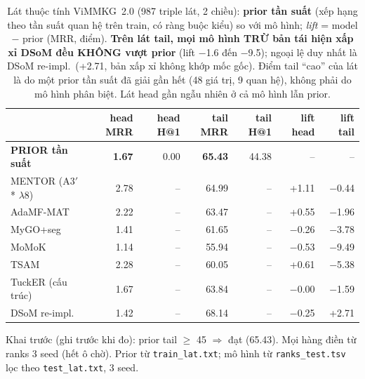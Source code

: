 \begin{table}[t]
\centering
\footnotesize
\setlength{\tabcolsep}{5pt}
\caption{Lát thuộc tính ViMMKG~2.0 (987 triple lát, 2 chiều): \textbf{prior tần suất} (xếp hạng
theo tần suất quan hệ trên train, có ràng buộc kiểu) so với mô hình; \emph{lift} = model $-$ prior
(MRR, điểm). \textbf{Trên lát tail, mọi mô hình TRỪ bản tái hiện xấp xỉ DSoM đều KHÔNG vượt prior}
(lift $-$1.6 đến $-$9.5); ngoại lệ duy nhất là DSoM re-impl.\ (+2.71, bản xấp xỉ không khớp mốc gốc).
Điểm tail ``cao'' của lát là do một prior tần suất đã giải gần hết (48 giá trị, 9 quan hệ), không
phải do mô hình phân biệt. Lát head gần ngẫu nhiên ở cả mô hình lẫn prior.}
\label{tab:lat_prior}
\begin{tabular}{l r r r r r r}
\toprule
 & head MRR & head H@1 & tail MRR & tail H@1 & lift head & lift tail \\
\midrule
\textbf{PRIOR tần suất} & \textbf{1.67} & 0.00 & \textbf{65.43} & 44.38 & -- & -- \\
\midrule
MENTOR (A3$'$* $\lambda$8) & 2.78 & -- & 64.99 & -- & +1.11 & $-$0.44 \\
AdaMF-MAT                  & 2.22 & -- & 63.47 & -- & +0.55 & $-$1.96 \\
MyGO+seg                   & 1.41 & -- & 61.65 & -- & $-$0.26 & $-$3.78 \\
MoMoK                      & 1.14 & -- & 55.94 & -- & $-$0.53 & $-$9.49 \\
TSAM                       & 2.28 & -- & 60.05 & -- & +0.61 & $-$5.38 \\
TuckER (cấu trúc)          & 1.67 & -- & 63.84 & -- & $-$0.00 & $-$1.59 \\
DSoM re-impl.              & 1.42 & -- & 68.14 & -- & $-$0.25 & +2.71 \\
\bottomrule
\end{tabular}

\vspace{2pt}
\begin{minipage}{\linewidth}\footnotesize\raggedright
Khai trước (ghi trước khi đo): prior tail $\geq$ 45 $\Rightarrow$ đạt (65.43).
Mọi hàng điền từ ranks 3 seed (hết ô chờ). Prior từ
\texttt{train\_lat.txt}; mô hình từ \texttt{ranks\_test.tsv} lọc theo \texttt{test\_lat.txt}, 3 seed.
\end{minipage}
\end{table}
